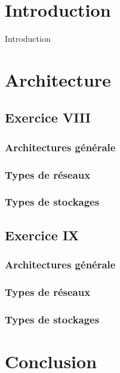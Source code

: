 \section{Introduction}
Introduction

\section{Architecture}
\subsection{Exercice VIII}
\subsubsection*{Architectures générale}
\subsubsection*{Types de réseaux}
\subsubsection*{Types de stockages}

\subsection{Exercice IX}
\subsubsection*{Architectures générale}
\subsubsection*{Types de réseaux}
\subsubsection*{Types de stockages}

\section{Conclusion}